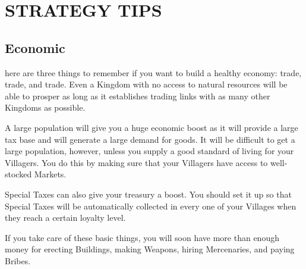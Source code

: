 
\chapter{\textsf{STRATEGY TIPS}}


\section{\textsf{Economic}}



here are three things to remember if you want to build a healthy economy: trade, trade, and trade. Even a Kingdom with no access to natural resources will be able to prosper as long as it establishes trading links with as many other Kingdoms as possible.


A large population will give you a huge economic boost as it will provide a large tax base and will generate a large demand for goods. It will be difficult to get a large population, however, unless you supply a good standard of living for your Villagers. You do this by making sure that your Villagers have access to well-stocked Markets.

Special Taxes can also give your treasury a boost. You should set it up so that Special Taxes will be automatically collected in every one of your Villages when they reach a certain loyalty level.

If you take care of these basic things, you will soon have more than enough money for erecting Buildings, making Weapons, hiring Mercenaries, and paying Bribes.

